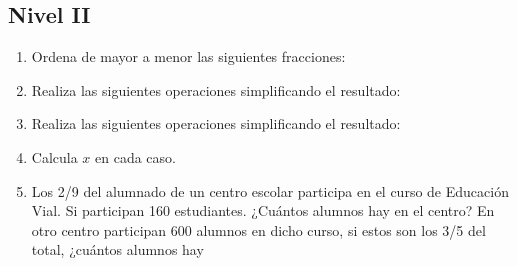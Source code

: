 \documentclass[10pt,twoside]{article}
\begin{document}
\subsection*{Nivel II}
\begin{enumerate}
\item Ordena de mayor a menor las siguientes fracciones:
\begin{enumerate}
\nopagebreak
{}
\end{enumerate}
\item Realiza las siguientes operaciones simplificando el resultado:
\begin{enumerate}
\end{enumerate}
\item Realiza las siguientes operaciones simplificando el resultado:
\begin{enumerate}
\end{enumerate}
\item Calcula $x$ en cada caso.
\begin{enumerate}
\end{enumerate}
\item Los 2/9 del alumnado de un centro escolar participa en el curso de Educación Vial. Si participan 160 estudiantes. ¿Cuántos alumnos hay en el centro? En otro centro participan 600 alumnos en dicho curso, si estos son los 3/5 del total, ¿cuántos alumnos hay

\end{enumerate}
\end{document}
